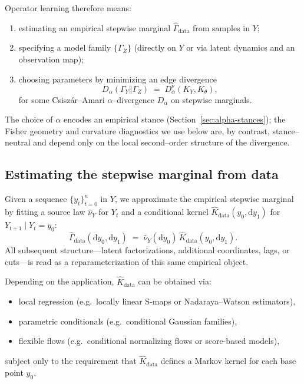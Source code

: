 \documentclass[11pt]{article}
\newcommand{\1}{\mathbf{1}}
\begin{document}
Operator learning therefore means:
\begin{enumerate}[leftmargin=1.5em]
  \item estimating an empirical stepwise marginal \(\widehat{\Gamma}_{\text{data}}\) from samples in \(Y\);
  \item specifying a model family \(\{\Gamma_Z\}\) (directly on \(Y\) or via latent dynamics and an
        observation map);
  \item choosing parameters by minimizing an edge divergence
  \[
    D_\alpha(\Gamma_Y\Vert\Gamma_Z)
    \;=\; D_\alpha^\nu(K_Y,K_\theta),
  \]
  for some Csiszár–Amari \(\alpha\)–divergence \(D_\alpha\) on stepwise marginals.
\end{enumerate}
The choice of \(\alpha\) encodes an empirical stance (Section~\ref{sec:alpha-stances}); the Fisher geometry and curvature diagnostics we use below are, by contrast, stance–neutral and depend only on the local second–order structure of the divergence.


\subsection{Estimating the stepwise marginal from data}
\label{subsec:edge-estimation}

Given a sequence \(\{y_t\}_{t=0}^n\) in \(Y\), we approximate the empirical stepwise marginal by fitting a source law \(\widehat{\nu}_Y\) for \(Y_t\) and a conditional kernel
\(\widehat{K}_{\text{data}}(y_0,\mathrm dy_1)\) for \(Y_{t+1}\mid Y_t=y_0\):
\[
  \widehat{\Gamma}_{\text{data}}(\mathrm dy_0,\mathrm dy_1)
  \;=\;
  \widehat{\nu}_Y(\mathrm dy_0)\,\widehat{K}_{\text{data}}(y_0,\mathrm dy_1).
\]
All subsequent structure---latent factorizations, additional coordinates, lags, or cuts---is read as a reparameterization of this same empirical object.

Depending on the application, \(\widehat{K}_{\text{data}}\) can be obtained via:
\begin{itemize}[leftmargin=1.5em]
  \item local regression (e.g.\ locally linear S-maps or Nadaraya--Watson estimators),
  \item parametric conditionals (e.g.\ conditional Gaussian families),
  \item flexible flows (e.g.\ conditional normalizing flows or score-based models),
\end{itemize}
subject only to the requirement that \(\widehat{K}_{\text{data}}\) defines a Markov kernel for each base point \(y_0\).
\end{document}
